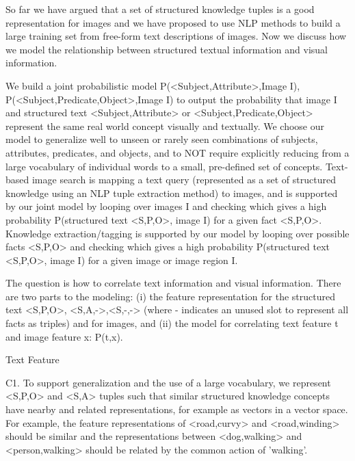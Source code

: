\documentclass[runningheads]{llncs}
\begin{document}
So far we have argued that a set of structured knowledge tuples is a good representation for images and we have proposed to use NLP methods to build a large training set from free-form text descriptions of images. Now we discuss how we model the relationship between structured textual information and visual information.

We build a joint probabilistic model P(<Subject,Attribute>,Image I), P(<Subject,Predicate,Object>,Image I) to output the probability that image I and structured text <Subject,Attribute> or <Subject,Predicate,Object> represent the same real world concept visually and textually. We choose our model to generalize well to unseen or rarely seen combinations of subjects, attributes, predicates, and objects, and to NOT require explicitly reducing from a large vocabulary of individual words to a small, pre-defined set of concepts. Text-based image search is mapping a text query (represented as a set of structured knowledge using an NLP tuple extraction method) to images, and is supported by our joint model by looping over images I and checking which gives a high probability P(structured text <S,P,O>, image I) for a given fact <S,P,O>. Knowledge extraction/tagging is supported by our model by looping over possible facts <S,P,O> and checking which gives a high probability P(structured text <S,P,O>, image I) for a given image or image region I.

The question is how to correlate text information and visual information. There are two parts to the modeling: (i) the feature representation for the structured text <S,P,O>, <S,A,->,<S,-,-> (where - indicates an unused slot to represent all facts as triples) and for images, and (ii) the model for correlating text feature t and image feature x: P(t,x).

Text Feature

C1. To support generalization and the use of a large vocabulary, we represent <S,P,O> and <S,A> tuples such that similar structured knowledge concepts have nearby and related representations, for example as vectors in a vector space. For example, the feature representations of <road,curvy> and <road,winding> should be similar and the representations between <dog,walking> and <person,walking> should be related by the common action of 'walking'.
\end{document}
